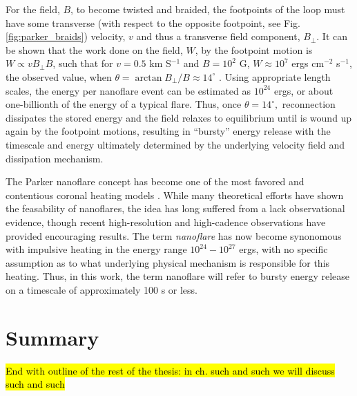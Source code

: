 %
\par For the field, $B$, to become twisted and braided, the footpoints of the loop must have some transverse (with respect to the opposite footpoint, see Fig. \ref{fig:parker_braids}) velocity, $v$ and thus a transverse field component, $B_{\perp}$. It can be shown that the work done on the field, $W$, by the footpoint motion is $W\propto vB_{\perp}B$, such that for $v=0.5$ km S$^{-1}$ and $B=10^2$ G, $W\approx10^7$ ergs cm$^{-2}$ s$^{-1}$, the observed value, when $\theta=\arctan{B_{\perp}/B}\approx14^{\circ}$ \citep{parker_nanoflares_1988}. Using appropriate length scales, the energy per nanoflare event can be estimated as $10^{24}$ ergs, or about one-billionth of the energy of a typical flare. Thus, once $\theta=14^{\circ},$ reconnection dissipates the stored energy and the field relaxes to equilibrium until is wound up again by the footpoint motions, resulting in ``bursty'' energy release with the timescale and energy ultimately determined by the underlying velocity field and dissipation mechanism.
%
\par The Parker nanoflare concept has become one of the most favored and contentious coronal heating models \citep{cargill_implications_1994,cargill_nanoflare_2004,klimchuk_solving_2006}. While many theoretical \citep[e.g.][]{bradshaw_diagnosing_2012,reep_diagnosing_2013} efforts have shown the feasability of nanoflares, the idea has long suffered from a lack observational evidence, though recent high-resolution and high-cadence observations \citep{testa_observing_2013,brosius_pervasive_2014,testa_evidence_2014} have provided encouraging results. The term \textit{nanoflare} has now become synonomous with impulsive heating in the energy range $10^{24}-10^{27}$ ergs, with no specific assumption as to what underlying physical mechanism is responsible for this heating. Thus, in this work, the term nanoflare will refer to bursty energy release on a timescale of approximately 100 s or less.  

%
\section{Summary}
\label{sec:summary}
%
\hl{End with outline of the rest of the thesis: in ch. such and such we will discuss such and such}